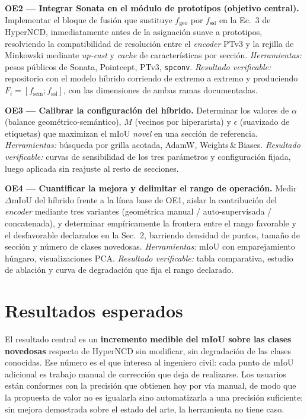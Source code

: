 \documentclass[9pt,twocolumn,a4paper]{extarticle}
\begin{document}
\textbf{OE2 --- Integrar Sonata en el módulo de prototipos
\textnormal{(objetivo central)}.} Implementar el bloque de fusión que
sustituye $f_{\mathrm{geo}}$ por $f_{\mathrm{ssl}}$ en la Ec.~3 de HyperNCD,
inmediatamente antes de la asignación suave a prototipos, resolviendo la
compatibilidad de resolución entre el \emph{encoder} PTv3 y la rejilla de
Minkowski mediante \emph{up-cast} y \emph{cache} de características por
sección. \emph{Herramientas:} pesos públicos de Sonata, Pointcept, PTv3,
\texttt{spconv}. \emph{Resultado verificable:} repositorio con el modelo
híbrido corriendo de extremo a extremo y produciendo
$F_i=[f_{\mathrm{sem}};f_{\mathrm{ssl}}]$, con las dimensiones de ambas ramas
documentadas.

\textbf{OE3 --- Calibrar la configuración del híbrido.} Determinar los
valores de $\alpha$ (balance geométrico-semántico), $M$ (vecinos por
hiperarista) y $\epsilon$ (suavizado de etiquetas) que maximizan el mIoU
\emph{novel} en una sección de referencia. \emph{Herramientas:} búsqueda por
grilla acotada, AdamW, Weights\,\&\,Biases. \emph{Resultado verificable:}
curvas de sensibilidad de los tres parámetros y configuración fijada, luego
aplicada sin reajuste al resto de secciones.

\textbf{OE4 --- Cuantificar la mejora y delimitar el rango de operación.}
Medir $\Delta$mIoU del híbrido frente a la línea base de OE1, aislar la
contribución del \emph{encoder} mediante tres variantes (geométrica manual /
auto-supervisada / concatenada), y determinar empíricamente la frontera entre
el rango favorable y el desfavorable declarados en la Sec.~2, barriendo
densidad de puntos, tamaño de sección y número de clases novedosas.
\emph{Herramientas:} mIoU con emparejamiento húngaro, visualizaciones PCA.
\emph{Resultado verificable:} tabla comparativa, estudio de ablación y curva
de degradación que fija el rango declarado.

\section{Resultados esperados}
El resultado central es un \textbf{incremento medible del mIoU sobre las
clases novedosas} respecto de HyperNCD sin modificar, sin degradación de las
clases conocidas. Ese número es el que interesa al ingeniero civil: cada
punto de mIoU adicional es trabajo manual de corrección que deja de
realizarse. Los usuarios están conformes con la precisión que obtienen hoy
por vía manual, de modo que la propuesta de valor no es igualarla sino
automatizarla a una precisión suficiente; sin mejora demostrada sobre el
estado del arte, la herramienta no tiene caso.
\end{document}
